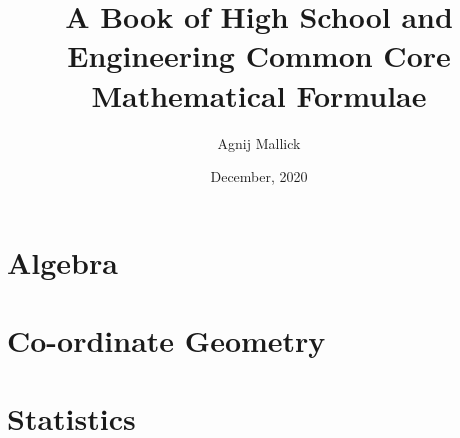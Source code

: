 \documentclass[openany, oneside]{book}
\title{A Book of High School and Engineering Common Core Mathematical Formulae}
\date{December, 2020}
\author{Agnij Mallick}
\begin{document}
	\maketitle
	\tableofcontents

	\part{Algebra}
		
		
		
		
		
		
		
		
		
		
	\part{Co-ordinate Geometry}
		
		
		
		
		
		
		
		
		

	\part{Statistics}
		
		
		
		
		
		
\end{document}
